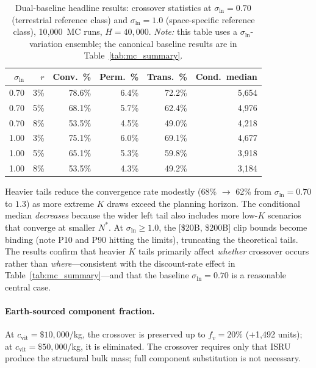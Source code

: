 \documentclass[preprint,12pt]{elsarticle}
\begin{document}
\begin{table}[htbp]
\centering
\caption{Dual-baseline headline results: crossover statistics at $\sigma_{\ln} = 0.70$ (terrestrial reference class) and $\sigma_{\ln} = 1.0$ (space-specific reference class), 10{,}000~MC runs, $H = 40{,}000$. \emph{Note:} this table uses a $\sigma_{\ln}$-variation ensemble; the canonical baseline results are in Table~\ref{tab:mc_summary}.}
\label{tab:dual_baseline}
\small
\begin{tabular}{@{}rrrrrr@{}}
\toprule
$\sigma_{\ln}$ & $r$ & Conv.\ \% & Perm.\ \% & Trans.\ \% & Cond.\ median \\
\midrule
0.70 & 3\%  & 78.6\% & 6.4\%  & 72.2\% & 5{,}654 \\
0.70 & 5\%  & 68.1\% & 5.7\%  & 62.4\% & 4{,}976 \\
0.70 & 8\%  & 53.5\% & 4.5\%  & 49.0\% & 4{,}218 \\
\midrule
1.00 & 3\%  & 75.1\% & 6.0\%  & 69.1\% & 4{,}677 \\
1.00 & 5\%  & 65.1\% & 5.3\%  & 59.8\% & 3{,}918 \\
1.00 & 8\%  & 53.5\% & 4.3\%  & 49.2\% & 3{,}184 \\
\bottomrule
\end{tabular}
\end{table}

Heavier tails reduce the convergence rate modestly (68\% $\to$ 62\% from $\sigma_{\ln} = 0.70$ to $1.3$) as more extreme $K$ draws exceed the planning horizon. The conditional median \emph{decreases} because the wider left tail also includes more low-$K$ scenarios that converge at smaller $N^*$. At $\sigma_{\ln} \geq 1.0$, the [\$20B, \$200B] clip bounds become binding (note P10 and P90 hitting the limits), truncating the theoretical tails. The results confirm that heavier $K$ tails primarily affect \emph{whether} crossover occurs rather than \emph{where}---consistent with the discount-rate effect in Table~\ref{tab:mc_summary}---and that the baseline $\sigma_{\ln} = 0.70$ is a reasonable central case.

\paragraph{Earth-sourced component fraction.} At $c_{\mathrm{vit}} = \$10{,}000$/kg, the crossover is preserved up to $f_v = 20\%$ ($+$1{,}492 units); at $c_{\mathrm{vit}} = \$50{,}000$/kg, it is eliminated. The crossover requires only that ISRU produce the structural bulk mass; full component substitution is not necessary.
\end{document}
